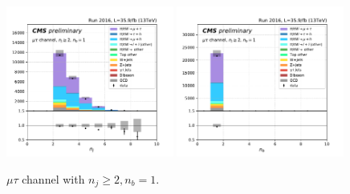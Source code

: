\begin{figure}[ht]
    \includegraphics[width=0.49\textwidth]{chapters/Analysis/sectionPlots/figures/kinematics_pickles/mutau/1b/mutau_1b_nJets.pdf}
    \includegraphics[width=0.49\textwidth]{chapters/Analysis/sectionPlots/figures/kinematics_pickles/mutau/1b/mutau_1b_nBJets.pdf}
    
    \caption{$\mu\tau$ channel with $n_j\geq2, n_b=1$.}
\end{figure}

